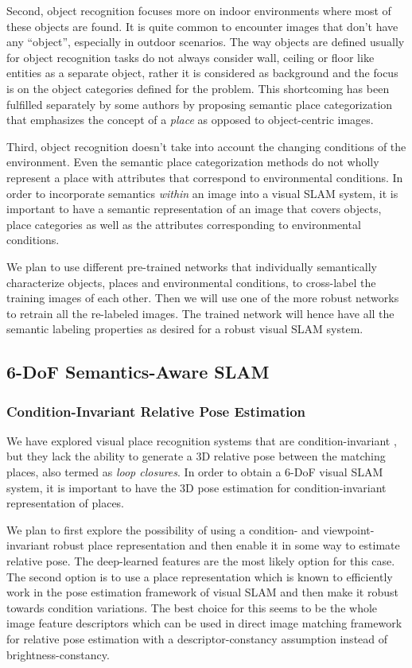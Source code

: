 \documentclass{article}
\begin{document}
Second, object recognition focuses more on indoor environments where most of these objects are found. It is quite common to encounter images that don't have any ``object'', especially in outdoor scenarios. The way objects are defined usually for object recognition tasks do not always consider wall, ceiling or floor like entities as a separate object, rather it is considered as background and the focus is on the object categories defined for the problem. This shortcoming has been fulfilled separately by some authors by proposing semantic place categorization that emphasizes the concept of a \emph{place} as opposed to object-centric images.

Third, object recognition doesn't take into account the changing conditions of the environment. Even the semantic place categorization methods do not wholly represent a place with attributes that correspond to environmental conditions. In order to incorporate semantics \emph{within} an image into a visual SLAM system, it is important to have a semantic representation of an image that covers objects, place categories as well as the attributes corresponding to environmental conditions. 

We plan to use different pre-trained networks that individually semantically characterize objects, places and environmental conditions, to cross-label the training images of each other. Then we will use one of the more robust networks to retrain all the re-labeled images. The trained network will hence have all the semantic labeling properties as desired for a robust visual SLAM system.

\subsection{6-DoF Semantics-Aware SLAM}

\subsubsection{Condition-Invariant Relative Pose Estimation}
We have explored visual place recognition systems that are condition-invariant \cite{Milford2012,Niko2015,chen2017deep}, but they lack the ability to generate a 3D relative pose between the matching places, also termed as \emph{loop closures}. In order to obtain a 6-DoF visual SLAM system, it is important to have the 3D pose estimation for condition-invariant representation of places.

We plan to first explore the possibility of using a condition- and viewpoint-invariant robust place representation and then enable it in some way to estimate relative pose. The deep-learned features are the most likely option for this case. The second option is to use a place representation which is known to efficiently work in the pose estimation framework of visual SLAM and then make it robust towards condition variations. The best choice for this seems to be the whole image feature descriptors which can be used in direct image matching framework for relative pose estimation with a descriptor-constancy assumption instead of brightness-constancy.
\end{document}
